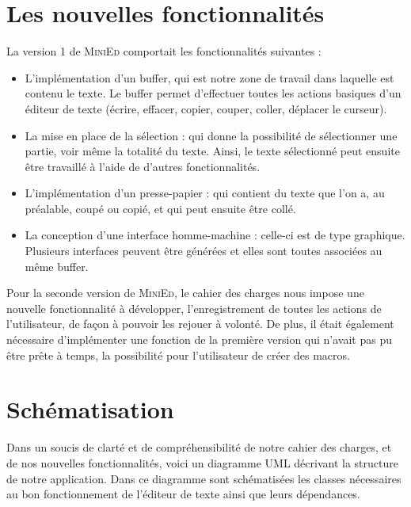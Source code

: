 \documentclass[a4paper, 12pt]{report}
\begin{document}
		\section*{Les nouvelles fonctionnalités}

		La version 1 de \textsc{MiniEd} comportait les fonctionnalités suivantes :

		\begin{itemize}
			\item L'implémentation d’un buffer, qui est notre zone de travail dans laquelle est contenu le texte. Le buffer permet d'effectuer toutes les actions basiques d'un éditeur de texte (écrire, effacer, copier, couper, coller, déplacer le curseur).

			\item La mise en place de la sélection : qui donne la possibilité de sélectionner une partie, voir même la totalité du texte. Ainsi, le texte sélectionné peut ensuite être travaillé à l’aide de d’autres fonctionnalités.

			\item L’implémentation d’un presse-papier : qui contient du texte que l’on a, au préalable, coupé ou copié, et qui peut ensuite être collé.

			\item La conception d’une interface homme-machine : celle-ci est de type graphique. Plusieurs interfaces peuvent être générées et elles sont toutes associées au même buffer. 

		\end{itemize}

		\vspace{0.5cm}

		Pour la seconde version de \textsc{MiniEd}, le cahier des charges nous impose une nouvelle fonctionnalité à développer, l'enregistrement de toutes les actions de l'utilisateur, de façon à pouvoir les rejouer à volonté. De plus, il était également nécessaire d'implémenter une fonction de la première version qui n'avait pas pu être prête à temps, la possibilité pour l'utilisateur de créer des macros.

		\section*{Schématisation}

		Dans un soucis de clarté et de compréhensibilité de notre cahier des charges, et de nos nouvelles fonctionnalités, voici un diagramme UML décrivant la structure de notre application. Dans ce diagramme sont schématisées les classes nécessaires au bon fonctionnement de l’éditeur de texte ainsi que leurs dépendances.
		
\end{document}
